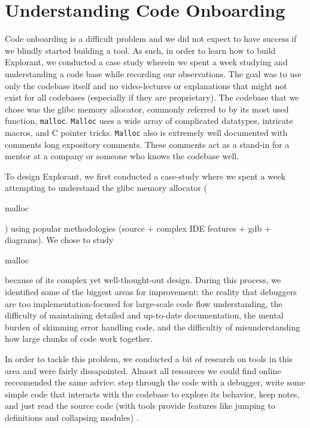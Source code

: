 \chapter{Understanding Code Onboarding}
Code onboarding is a difficult problem and we did not expect to have success if we blindly started building a tool.  As such, in order to learn how to build Explorant, we conducted a case study wherein we spent a week studying and understanding a code base while recording our observations. The goal was to use only the codebase itself and no video-lectures or explanations that might not exist for all codebases (especially if they are proprietary). The codebase that we chose was the glibc \cite{glibc} memory allocator, commonly referred to by its most used function, \texttt{malloc}\cite{malloc}. \texttt{Malloc} uses a wide array of complicated datatypes, intricate macros, and C pointer tricks. \texttt{Malloc} also is extremely well documented with comments long expository comments. These comments act as a stand-in for a mentor at a company or someone who knows the codebase well.

To design Explorant, we first conducted a case-study where we spent a week attempting to understand the glibc memory allocator (\begin{tt}malloc\end{tt}) using popular methodologies (source + complex IDE features + gdb + diagrams). We chose to study \begin{tt}malloc\end{tt} because of its complex yet well-thought-out design. During this process, we identified some of the biggest areas for improvement: the reality that debuggers are too implementation-focused for large-scale code flow understanding, the difficulty of maintaining detailed and up-to-date documentation, the mental burden of skimming error handling code, and the difficultiy of misunderstanding how large chunks of code work together. 

In order to tackle this problem, we conducted a bit of research on tools in this area and were fairly dissapointed. Almost all resources we could find online reccomended the same advice: step through the code with a debugger, write some simple code that interacts with the codebase to explore its behavior, keep notes, and just read the source code (with tools provide features like jumping to definitions and collapsing modules) \cite{onboarding-case-study, onboarding-ramp}.

